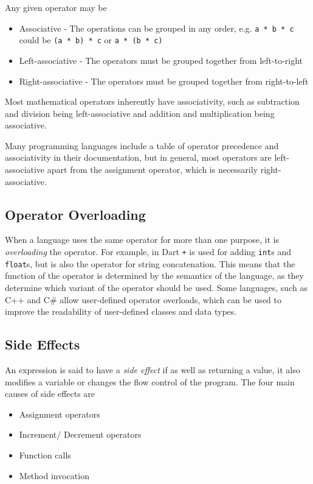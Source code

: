Any given operator may be
\begin{itemize}
  \item Associative - The operations can be grouped in any order, e.g. \verb`a * b * c` could be \verb`(a * b) * c`
   or \verb`a * (b * c)`
  \item Left-associative - The operators must be grouped together from left-to-right
  \item Right-associative - The operators must be grouped together from right-to-left
\end{itemize}

Most mathematical operators inherently have associativity, such as subtraction and division being left-associative and
 addition and multiplication being associative.

Many programming languages include a table of operator precedence and associativity in their documentation, but in
 general, most operators are left-associative apart from the assignment operator, which is necessarily right-associative.

\subsection*{Operator Overloading}

When a language uses the same operator for more than one purpose, it is \textit{overloading} the operator. For example,
 in Dart \verb`+` is used for adding \verb`int`s and \verb`float`s, but is also the operator for string concatenation.
 This means that the function of the operator is determined by the semantics of the language, as they determine which
 variant of the operator should be used. Some languages, such as C++ and C\# allow user-defined operator overloads, which
 can be used to improve the readability of user-defined classes and data types.

\subsection*{Side Effects}

An expression is said to have a \textit{side effect} if as well as returning a value, it also modifies a variable or
 changes the flow control of the program. The four main causes of side effects are
\begin{itemize}
  \item Assignment operators
  \item Increment/ Decrement operators
  \item Function calls
  \item Method invocation
\end{itemize}


